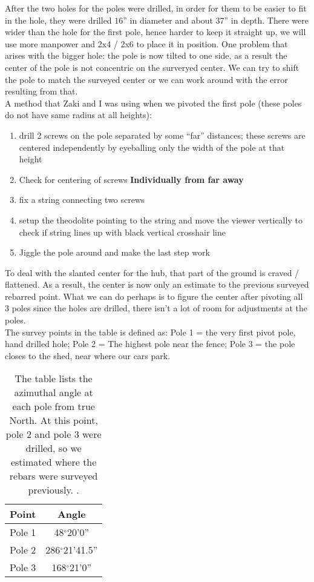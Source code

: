 \documentclass[12pt, letter]{article}
\begin{document}
After the two holes for the poles were drilled, in order for them to be easier to fit in the hole, they were drilled $16$'' in diameter and about $37$'' in depth. There were wider than the hole for the first pole, hence harder to keep it straight up, we will use more manpower and 2x4 / 2x6 to place it in position. One problem that arises with the bigger hole: the pole is now tilted to one side, as a result the center of the pole is not concentric on the surveryed center. We can try to shift the pole to match the surveyed center or we can work around with the error resulting from that.\\

A method that Zaki and I was using when we pivoted the first pole (these poles do not have same radius at all heights):
\begin{enumerate}
\item{drill 2 screws on the pole separated by some ``far'' distances; these screws are centered independently by eyeballing only the width of the pole at that height}
\item{Check for centering of screws \bf{Individually} from far away }
\item{fix a string connecting two screws}
\item{setup the theodolite pointing to the string and move the viewer vertically to check if string lines up with black vertical crosshair line}
\item{Jiggle the pole around and make the last step work}
\end{enumerate}

To deal with the slanted center for the hub, that part of the ground is craved / flattened. As a result, the center is now only an estimate to the previous surveyed rebarred point. What we can do perhaps is to figure the center after pivoting all 3 poles since the holes are drilled, there isn't a lot of room for adjustments at the poles. \\


The survey points in the table is defined as:
Pole 1 = the very first pivot pole, hand drilled hole; 
Pole 2 = The highest pole near the fence; 
Pole 3 = the pole closes to the shed, near where our cars park.
 

\begin{table}[!h]
\centering
\begin{tabular}{|c|c|} \hline

Point & Angle  \\ \hline
Pole 1 & 48$^\circ$20'0'' \\ \hline
Pole 2 & 286$^\circ$21'41.5'' \\ \hline
Pole 3 & 168$^\circ$21'0'' \\ \hline


\end{tabular}
\caption{The table lists the azimuthal angle at each pole from true North. At this point, pole 2 and pole 3 were drilled, so we estimated where the rebars were surveyed previously.  \label{Tab:az_at_poles}.}
\end{table}
\end{document}
